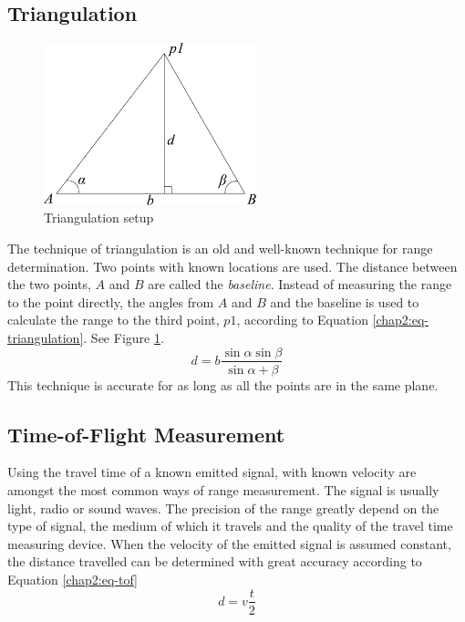 \subsection{Triangulation}
\begin{figure}[htbp]
    \centering
    \includegraphics[width=0.55\textwidth]{pics/triangulation}
    \caption{Triangulation setup}
    \label{chap2:fig-triangulation}
\end{figure}
The technique of triangulation is an old and well-known technique for range determination.
Two points with known locations are used. The distance between the two points, $A$ and $B$ are called
the \emph{baseline}. Instead of measuring the range to the point directly, the angles
from $A$ and $B$ and the baseline is used to calculate the range to the third point, $p1$,
according to Equation \ref{chap2:eq-triangulation}. See Figure
\ref{chap2:fig-triangulation}. 
\begin{equation}
    \label{chap2:eq-triangulation}
    d = b \frac{\sin{\alpha} \sin{\beta}}{\sin{\alpha + \beta}}
\end{equation}
This technique is accurate for as long as all the points are in the same plane.\cite{triangulation}


\subsection{Time-of-Flight Measurement}
Using the travel time of a known emitted signal, with known velocity are amongst the most
common ways of range measurement. 
The signal is usually light, radio or sound waves. The precision of the
range greatly depend on the type of signal, the medium of which it travels and the quality of
the travel time measuring device. When the velocity of the emitted signal is assumed constant, 
the distance travelled can be determined with great accuracy according to Equation \eqref{chap2:eq-tof}
\begin{equation}
    \label{chap2:eq-tof}
    d = v \frac{t}{2}
\end{equation}



